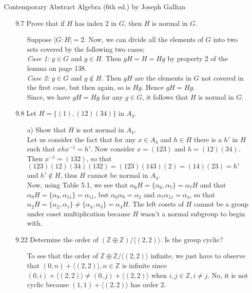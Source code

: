 \documentclass[12pt]{article}
\begin{document}
Contemporary Abstract Algebra (6th ed.) by Joseph Gallian
\begin{enumerate}

\item[9.7] Prove that if $H$ has index 2 in $G$, then $H$ is normal in $G$.
\begin{enumerate}
\item[] Suppose $|G:H| = 2$. Now, we can divide all the elements of $G$ into two sets 
covered by the following two cases; \\
\emph{Case 1:} $g \in G$ and $g \in H$. Then $gH = H = Hg$ by property 2 of the lemma on page 138. \\
\emph{Case 2:} $g \in G$ and $g \not\in H$. Then $gH$ are the elements in $G$ not covered in the first
case, but then again, so is $Hg$. Hence $gH = Hg$. \\
Since, we have $gH = Hg$ for any $g \in G$, it follows that $H$ is normal in $G$.
\end{enumerate}

\item[9.8] Let $H = \{ (1), (12)(34) \}$ in $A_4$.
\begin{enumerate}
\item[a)] Show that $H$ is not normal in $A_4$. \\
Let us consider the fact that for any $x \in A_4$ and $h \in H$ there is a $h'$ in 
$H$ such that $xhx^{-1} = h'$. Now consider $x = (123)$ and $h = (12)(34)$. Then $x^{-1} = (132)$, 
so that $(123)(12)(34)(132) = (123)(143)(2) = (14)(23) = h'$ and $h' \not\in H$, thus $H$ cannot
be normal in $A_4$. \\
Now, using Table 5.1, we see that $\alpha_6H = \{ \alpha_6, \alpha_7 \} = \alpha_7H$ and that 
$\alpha_9H = \{ \alpha_9, \alpha_{11} \} = \alpha_{11}$, but $\alpha_6\alpha_9 = \alpha_2$ and
$\alpha_7\alpha_{11} = \alpha_4$, so that $\alpha_2H = \{ \alpha_2, \alpha_1 \} \neq \{
\alpha_4, \alpha_3 \} = \alpha_4H$. The left cosets of $H$ cannot be a group under coset multiplication
because $H$ wasn't a normal subgroup to begin with.
\end{enumerate}

\item[9.22] Determine the order of $(\mathbb{Z} \oplus \mathbb{Z})/\langle (2, 2)\rangle$.
Is the group cyclic?
\begin{enumerate}
\item[] To see that the order of $\mathbb{Z} \oplus \mathbb{Z}/\langle (2, 2)\rangle$ infinite, we just
have to observe that $(0, n) + \langle (2, 2)\rangle, n \in \mathbb{Z}$ is infinite since 
$(0, i) + \langle (2, 2)\rangle \neq (0, j) + \langle (2, 2)\rangle$ when $i, j \in \mathbb{Z}, i \neq j$.
No, it is not cyclic because $(1, 1) + \langle (2, 2)\rangle$ has order 2.
\end{enumerate}


\end{enumerate}
\end{document}
